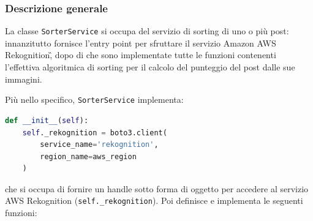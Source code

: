 \subsubsection{Descrizione generale}
La classe \verb+SorterService+ si occupa del servizio di sorting di uno o più post: innanzitutto fornisce l'entry point per sfruttare il servizio Amazon AWS Rekognition\G, dopo di che sono implementate tutte le funzioni contenenti l'effettiva algoritmica di sorting per il calcolo del punteggio del post dalle sue immagini.

Più nello specifico, \verb+SorterService+ implementa:
\begin{lstlisting}[language=Python]
def __init__(self):
    self._rekognition = boto3.client(
        service_name='rekognition', 
        region_name=aws_region
    )
\end{lstlisting} 
che si occupa di fornire un handle sotto forma di oggetto per accedere al servizio AWS Rekognition
(\verb+self._rekognition+). 
Poi definisce e implementa le seguenti funzioni:
